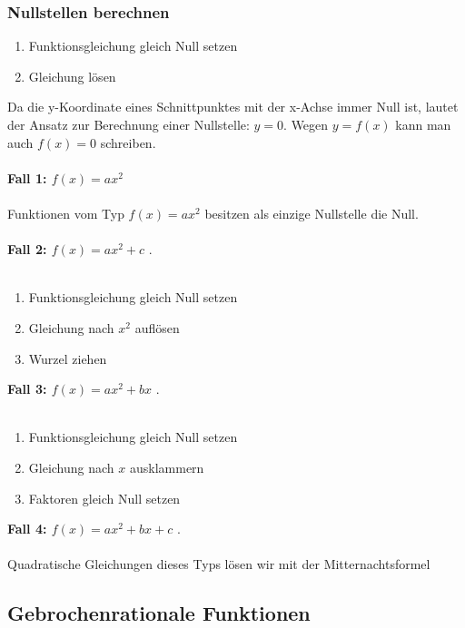 \begin{multicols}{2}
    \subsubsection{Nullstellen berechnen}
    \begin{enumerate}
        \item Funktionsgleichung gleich Null setzen
        \item Gleichung lösen
    \end{enumerate}
    Da die y-Koordinate eines Schnittpunktes mit der x-Achse immer Null ist, lautet der Ansatz zur Berechnung einer Nullstelle: $y = 0$. Wegen $y = f(x)$ kann man auch $f(x) = 0$ schreiben. \\~\\
    \textbf{Fall 1: $f(x) = ax^2$} \\~\\
    Funktionen vom Typ $f(x) = ax^2$ besitzen als einzige Nullstelle die Null. \\~\\
    \textbf{Fall 2: $f(x) = ax^2 + c$} . \\~\\
    \begin{enumerate}
        \item     Funktionsgleichung gleich Null setzen
        \item     Gleichung nach $x^2$ auflösen
        \item     Wurzel ziehen
    \end{enumerate}

    \textbf{Fall 3: $f(x) = ax^2 + bx$} . \\~\\
    \begin{enumerate}
        \item     Funktionsgleichung gleich Null setzen
        \item     Gleichung nach $x$ ausklammern
        \item     Faktoren gleich Null setzen
    \end{enumerate}

    \textbf{Fall 4: $f(x) = ax^2 + bx + c$} . \\~\\
    Quadratische Gleichungen dieses Typs lösen wir mit der Mitternachtsformel
    \subsection{Gebrochenrationale Funktionen}
    \vspace{-4mm}

\end{multicols}

